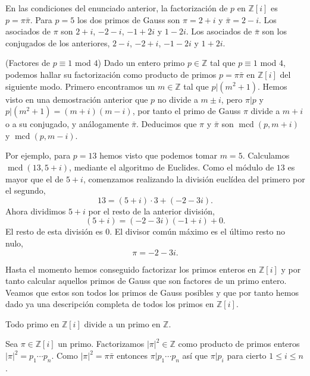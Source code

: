 
En las condiciones del enunciado anterior, la factorización de \(p\) en
\(\mathbb Z[i]\) es \(p=\pi\bar\pi\). Para \(p=5\) los dos primos de
Gauss son \(\pi=2+i\) y \(\bar\pi=2-i\). Los asociados de \(\pi\) son
\(2+i\), \(-2-i\), \(-1+2i\) y \(1-2i\). Los asociados de \(\bar\pi\)
son los conjugados de los anteriores, \(2-i\), \(-2+i\), \(-1-2i\) y
\(1+2i\). 

\textrm{\normalfont (Factores de $p\equiv 1$ mod $4$)}\label{exm:prime1mod4}
Dado un entero primo \(p\in\mathbb Z\) tal que \(p\equiv 1\) mod \(4\),
podemos hallar su factorización como producto de primos \(p=\pi\bar\pi\)
en \(\mathbb Z[i]\) del siguiente modo. Primero encontramos un
\(m\in\mathbb Z\) tal que \(p|(m^2+1)\). Hemos visto en una demostración
anterior que \(p\) no divide a \(m\pm i\), pero \(\pi|p\) y
\(p|(m^2+1)=(m+i)(m-i)\), por tanto el primo de Gauss \(\pi\) divide a
\(m+i\) o a su conjugado, y análogamente \(\bar\pi\). Deducimos que
\(\pi\) y \(\bar \pi\) son \(\operatorname{mcd}(p,m+i)\) y
\(\operatorname{mcd}(p,m-i)\).

Por ejemplo, para \(p=13\) hemos visto que podemos tomar \(m=5\).
Calculamos \(\operatorname{mcd}(13, 5+i)\), mediante el algoritmo de
Euclides. Como el módulo de \(13\) es mayor que el de \(5+i\),
comenzamos realizando la división euclídea del primero por el segundo,
\[13=(5+i)\cdot 3+(-2-3i).\] Ahora dividimos \(5+i\) por el resto de la
anterior división, \[(5+i)=(-2-3i)(-1+i)+0.\] El resto de esta división
es \(0\). El divisor común máximo es el último resto no nulo,
\[\pi=-2-3i.\] 

Hasta el momento hemos conseguido factorizar los primos enteros en
\(\mathbb{Z}[i]\) y por tanto calcular aquellos primos de Gauss que son
factores de un primo entero. Veamos que estos son todos los primos de
Gauss posibles y que por tanto hemos dado ya una descripción completa de
todos los primos en \(\mathbb Z[i]\).


Todo primo en \(\mathbb Z[i]\) divide a un primo en \(\mathbb Z\).


Sea \(\pi\in\mathbb Z[i]\) un primo. Factorizamos
\(|\pi|^2\in\mathbb Z\) como producto de primos enteros
\(|\pi|^2=p_1\cdots p_n\). Como \(|\pi|^2=\pi\bar\pi\) entonces
\(\pi|p_1\cdots p_n\) así que \(\pi|p_i\) para cierto \(1\leq i\leq n\).

